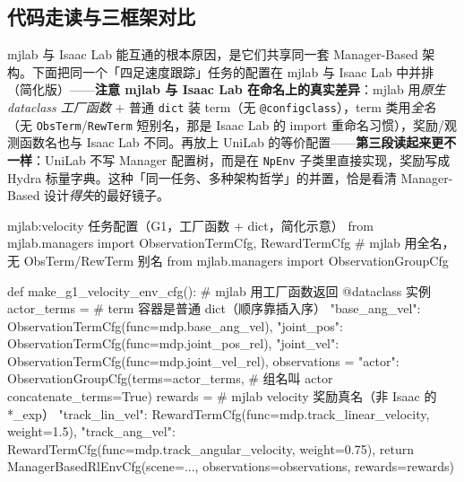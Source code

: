 
\subsection{代码走读与三框架对比}
\label{sec:rlmc-eco-manager-compare}

mjlab 与 Isaac Lab 能互通的根本原因，是它们共享同一套 Manager-Based 架构。下面把同一个「四足速度跟踪」任务的配置在 mjlab 与 Isaac Lab 中并排（简化版）——\textbf{注意 mjlab 与 Isaac Lab 在命名上的真实差异}：mjlab 用\emph{原生 dataclass 工厂函数} + 普通 \verb|dict| 装 term（无 \verb|@configclass|），term 类用\emph{全名}（无 \verb|ObsTerm|/\allowbreak\verb|RewTerm| 短别名，那是 Isaac Lab 的 import 重命名习惯），奖励/观测函数名也与 Isaac Lab 不同。再放上 UniLab 的等价配置——\textbf{第三段读起来更不一样}：UniLab 不写 Manager 配置树，而是在 \verb|NpEnv| 子类里直接实现，奖励写成 Hydra 标量字典。这种「同一任务、多种架构哲学」的并置，恰是看清 Manager-Based 设计\emph{得失}的最好镜子。

\begin{codebox}[Python]{mjlab:velocity 任务配置（G1，工厂函数 + dict，简化示意）}
from mjlab.managers import ObservationTermCfg, RewardTermCfg   # mjlab 用全名，无 ObsTerm/RewTerm 别名
from mjlab.managers import ObservationGroupCfg

def make_g1_velocity_env_cfg():                # mjlab 用工厂函数返回 @dataclass 实例
    actor_terms = {                            # term 容器是普通 dict（顺序靠插入序）
        "base_ang_vel": ObservationTermCfg(func=mdp.base_ang_vel),
        "joint_pos":    ObservationTermCfg(func=mdp.joint_pos_rel),
        "joint_vel":    ObservationTermCfg(func=mdp.joint_vel_rel),
    }
    observations = {"actor": ObservationGroupCfg(terms=actor_terms,   # 组名叫 actor
                                                 concatenate_terms=True)}
    rewards = {                                # mjlab velocity 奖励真名（非 Isaac 的 *_exp）
        "track_lin_vel": RewardTermCfg(func=mdp.track_linear_velocity,  weight=1.5),
        "track_ang_vel": RewardTermCfg(func=mdp.track_angular_velocity, weight=0.75),
    }
    return ManagerBasedRlEnvCfg(scene=..., observations=observations, rewards=rewards)
\end{codebox}

